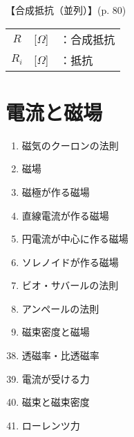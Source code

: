 \documentclass[10pt]{jarticle}
\begin{document}
\vskip3mm
\noindent
【合成抵抗（並列）】{\footnotesize (p. 80)}

\begin{tabular}{ccl}
$R$	&[$\Omega$]	&：合成抵抗 \\
$R_i$	&[$\Omega$]	&：抵抗 \\
\end{tabular}








\newpage
\addtocounter{page}{-1}
\thispagestyle{empty}
\section{電流と磁場}

\begin{enumerate}
\setcounter{enumi}{\thepage}
\small
\itemsep-4mm
\item 磁気のクーロンの法則 \\
\item 磁場 \\
\item 磁極が作る磁場 \\
\item 直線電流が作る磁場 \\
\item 円電流が中心に作る磁場 \\
\item ソレノイドが作る磁場 \\
\item ビオ・サバールの法則 \\
\item アンペールの法則 \\
\item 磁束密度と磁場 \\
\end{enumerate}


\newpage
\addtocounter{page}{-1}
\thispagestyle{empty}

\vspace*{-10mm}
\begin{enumerate}
\setcounter{enumi}{37}
\small
\itemsep-4mm
\item 透磁率・比透磁率 \\
\item 電流が受ける力 \\
\item 磁束と磁束密度 \\
\item ローレンツ力 \\
\end{enumerate}
\end{document}
